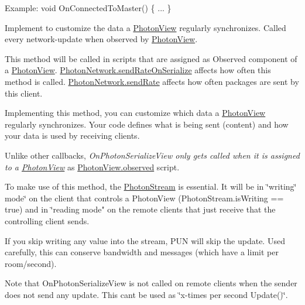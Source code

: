 \begin{Desc}
\begin{description}
Example\+: void On\+Connected\+To\+Master() \{ ... \} \item[{\em 
On\+Photon\+Serialize\+View\hypertarget{group__public_api_ggaf30bbea51cc8c4b1ddc239d1c5c1468fa864e7f0d7510922caf9c107b8dd771a3}{}\label{group__public_api_ggaf30bbea51cc8c4b1ddc239d1c5c1468fa864e7f0d7510922caf9c107b8dd771a3}
}]Implement to customize the data a \hyperlink{class_photon_view}{Photon\+View} regularly synchronizes. Called every \textquotesingle{}network-\/update\textquotesingle{} when observed by \hyperlink{class_photon_view}{Photon\+View}. 

This method will be called in scripts that are assigned as Observed component of a \hyperlink{class_photon_view}{Photon\+View}. \hyperlink{class_photon_network_ac23d14ad150a87d51f4ffaa286db29e1}{Photon\+Network.\+send\+Rate\+On\+Serialize} affects how often this method is called. \hyperlink{class_photon_network_a154fc601fac7f0fddd704231189457fb}{Photon\+Network.\+send\+Rate} affects how often packages are sent by this client.

Implementing this method, you can customize which data a \hyperlink{class_photon_view}{Photon\+View} regularly synchronizes. Your code defines what is being sent (content) and how your data is used by receiving clients.

Unlike other callbacks, {\itshape On\+Photon\+Serialize\+View only gets called when it is assigned to a \hyperlink{class_photon_view}{Photon\+View}} as \hyperlink{class_photon_view_a7429864925f0716b072e8a7c4b23c59b}{Photon\+View.\+observed} script.

To make use of this method, the \hyperlink{class_photon_stream}{Photon\+Stream} is essential. It will be in \char`\"{}writing\char`\"{} mode\char`\"{} on the
    client that controls a Photon\+View (\+Photon\+Stream.\+is\+Writing == true) and in \char`\"{}reading mode" on the remote clients that just receive that the controlling client sends.

If you skip writing any value into the stream, P\+UN will skip the update. Used carefully, this can conserve bandwidth and messages (which have a limit per room/second).

Note that On\+Photon\+Serialize\+View is not called on remote clients when the sender does not send any update. This can\textquotesingle{}t be used as \char`\"{}x-\/times per second Update()\char`\"{}.


\end{description}
\end{Desc}

